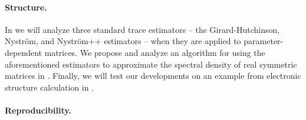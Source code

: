 \paragraph{Structure.} In  we will analyze three standard trace estimators -- the Girard-Hutchinson, Nyström, and Nyström++ estimators -- when they are applied to parameter-dependent matrices. We propose and analyze an algorithm for using the aforementioned estimators to approximate the spectral density of real symmetric matrices in . Finally, we will test our developments on an example from electronic structure calculation in .

\paragraph{Reproducibility.} 
